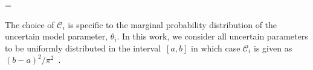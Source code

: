 \be
{} =  
\ee

\noindent The choice of $\mathcal{C}_i$ is specific to the marginal probability distribution of the uncertain model
parameter, $\theta_i$. In this work, we consider all uncertain parameters to be uniformly
distributed in the interval~$[a,b]$ in which case $\mathcal{C}_i$  is given as $(b-a)^{2}/\pi^2$~\cite{Roustant:2014}.

































